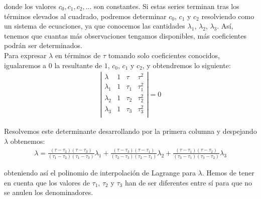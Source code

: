 \documentclass[11pt]{article}
\begin{document}
\noindent donde los valores $c_0, c_1, c_2, ...$ son constantes. Si estas series terminan tras los términos elevados al cuadrado, podremos determinar $c_0$, $c_1$ y $c_2$ resolviendo como un sistema de ecuaciones, ya que conocemos las cantidades $\lambda_1$, $\lambda_2$, $\lambda_3$. Así, tenemos que cuantas más observaciones tengamos disponibles, más coeficientes podrán ser determinados.\\

Para expresar $\lambda$ en términos de $\tau$ tomando solo coeficientes conocidos, igualaremos a 0 la resultante de $1$, $c_0$, $c_1$ y $c_2$, y obtendremos lo siguiente:
\begin{align}
\left|
\begin{array}{cccc}
\lambda & 1 & \tau & \tau^2\\
\lambda_1 & 1 & \tau_1 & \tau^2_1\\
\lambda_2 & 1 & \tau_2 & \tau^2_2\\
\lambda_3 & 1 & \tau_3 & \tau^2_3\\
\end{array}
\right|
=0
\label{eq:resultante}
\end{align}

Resolvemos este determinante desarrollando por la primera columna y despejando $\lambda$ obtenemos:
\begin{align}
\lambda=
\frac{(\tau-\tau_2)(\tau-\tau_3)}{(\tau_1-\tau_2)(\tau_1-\tau_3)}\lambda_1
+\frac{(\tau-\tau_3)(\tau-\tau_1)}{(\tau_2-\tau_3)(\tau_2-\tau_1)}\lambda_2
+\frac{(\tau-\tau_1)(\tau-\tau_2)}{(\tau_3-\tau_1)(\tau_3-\tau_2)}\lambda_3
\label{eq:lambda_value}
\end{align}

\noindent obteniendo así el polinomio de interpolación de Lagrange para $\lambda$. Hemos de tener en cuenta que los valores de $\tau_1$, $\tau_2$ y $\tau_3$ han de ser diferentes entre sí para que no se anulen los denominadores.\\
\end{document}
